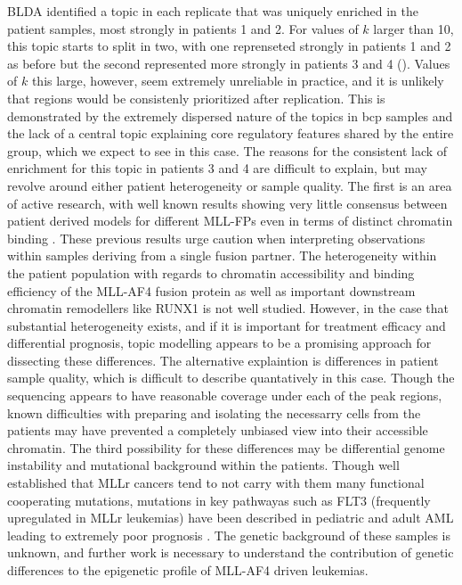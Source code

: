 BLDA identified a topic in each replicate that was uniquely enriched in the patient samples, most strongly in patients 1 and 2. For values of $k$ larger than 10, this topic starts to split in two, with one reprenseted strongly in patients 1 and 2 as before but the second represented more strongly in patients 3 and 4 (). Values of $k$ this large, however, seem extremely unreliable in practice, and it is unlikely that regions would be consistenly prioritized after replication. This is demonstrated by the extremely dispersed nature of the topics in \gls{bcp} samples and the lack of a central topic explaining core regulatory features shared by the entire group, which we expect to see in this case. The reasons for the consistent lack of enrichment for this topic in patients 3 and 4 are difficult to explain, but may revolve around either patient heterogeneity or sample quality. The first is an area of active research, with well known results showing very little consensus between patient derived models for different MLL-FPs even in terms of distinct chromatin binding \cite{Lin2016}. These previous results urge caution when interpreting observations within samples deriving from a single fusion partner. The heterogeneity within the patient population with regards to chromatin accessibility and binding efficiency of the MLL-AF4 fusion protein as well as important downstream chromatin remodellers like RUNX1 is not well studied. However, in the case that substantial heterogeneity exists, and if it is important for treatment efficacy and differential prognosis, topic modelling appears to be a promising approach for dissecting these differences. The alternative explaintion is differences in patient sample quality, which is difficult to describe quantatively in this case. Though the sequencing appears to have reasonable coverage under each of the peak regions, known difficulties with preparing and isolating the necessarry cells from the patients may have prevented a completely unbiased view into their accessible chromatin. The third possibility for these differences may be differential genome instability and mutational background within the patients. Though well established that MLLr cancers tend to not carry with them many functional cooperating mutations, mutations in key pathwayas such as FLT3 (frequently upregulated in MLLr leukemias) have been described in pediatric and adult AML leading to extremely poor prognosis \cite{CE2014,Sternberg2005,Sexauer2017}. The genetic background of these samples is unknown, and further work is necessary to understand the contribution of genetic differences to the epigenetic profile of MLL-AF4 driven leukemias.


